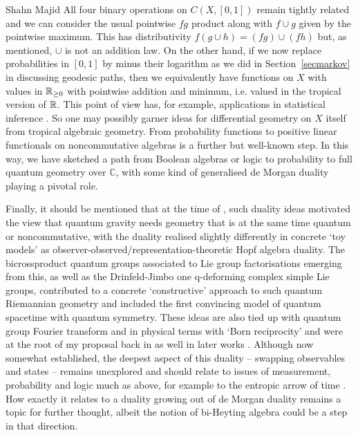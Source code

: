 \begin{artengenv}{Shahn Majid}
All four binary operations on $C(X,[0,1])$ remain tightly related and we can consider the usual pointwise $fg$ product along with $f\cup g$ given by the pointwise maximum. This has distributivity $f(g\cup h)=(fg)\cup (fh)$ but, as mentioned, $\cup$ is not an addition law. On the other hand, if we now replace probabilities in $[0,1]$ by minus their logarithm as we did in Section~\ref{secmarkov} in discussing geodesic paths, then we equivalently have functions on $X$ with values in ${\mathbb{R}}_{\ge 0}$ with pointwise addition and minimum, i.e. valued in the tropical version of ${\mathbb{R}}$. This point of view has, for example, applications in statistical inference \parencite{Sturm}. So one may possibly garner ideas for differential geometry on $X$ itself from tropical algebraic geometry. From probability functions to positive linear functionals on noncommutative algebras is a further but well-known step. In this way, we have sketched a path from Boolean algebras or logic to probability to full quantum geometry over $\mathbb{C}$, with some kind of generalised de Morgan duality playing a pivotal role. 

Finally, it should be mentioned that at the time of \parencite{Ma:pri}, such duality ideas motivated the view that quantum gravity needs geometry that is at the same time quantum or noncommutative, with the duality realised slightly differently in concrete `toy models' \parencite{Ma:pla} as observer-observed/representation-theoretic Hopf algebra duality. The bicrossproduct quantum groups associated to Lie group factorisations emerging from this, as well as the Drinfeld-Jimbo one q-deforming complex simple Lie groups, contributed to a concrete `constructive' approach to such quantum Riemannian geometry and included the first convincing model \parencite{MaRue} of quantum spacetime with quantum symmetry. These ideas are also tied up with quantum group Fourier transform and in physical terms with `Born reciprocity' and were at the root of my proposal back in \parencite{Ma:pla,Ma:pri} as well in later works \parencite{Ma:ess, Ma:qg3, Ma:sel,Ma:eme}. Although now somewhat established, the deepest aspect of this duality -- swapping observables and states -- remains unexplored and should relate to issues of measurement, probability and logic much as above, for example to the entropic arrow of time \parencite{Ma:ran}. How exactly it relates to a duality growing out of de Morgan duality remains a topic for further thought, albeit the notion of bi-Heyting algebra \parencite{ReyZol} could be a step in that direction. 
 


\end{artengenv}
